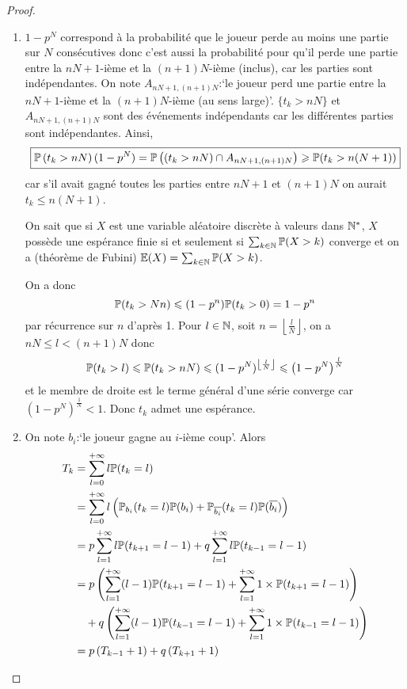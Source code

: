 \documentclass[12pt]{article}
\begin{document}
\begin{proof}
    \phantom{}
    \begin{enumerate}
        \item $1-p^{N}$ correspond à la probabilité que le joueur perde au moins une partie sur $N$ consécutives donc c'est aussi la probabilité pour qu'il perde une partie entre la $nN+1$-ième et la $(n+1)N$-ième (inclus), car les parties sont indépendantes. On note $A_{nN+1,(n+1)N}$:`le joueur perd une partie entre la $nN+1$-ième et la $(n+1)N$-ième (au sens large)'. $\lbrace t_{k}>nN\rbrace$ et $A_{nN+1,(n+1)N}$ sont des événements indépendants car les différentes parties sont indépendantes. Ainsi,
        \begin{equation}
            \boxed{\P\left(t_{k}>nN\right)(1-p^{N})=\P\left(\left(t_{k}>nN\right)\cap A_{nN+1,(n+1)N}\right)\geqslant\P(t_{k}>n(N+1))}
        \end{equation}
        car s'il avait gagné toutes les parties entre $nN+1$ et $(n+1)N$ on aurait $t_{k}\leqslant n(N+1)$.

        On sait que si $X$ est une variable aléatoire discrète à valeurs dans $\N^{*}$, $X$ possède une espérance finie si et seulement si $\sum_{k\in\N}\P(X>k)$ converge et on a (théorème de Fubini) $\E(X)=\sum_{k\in\N}\P(X>k)$.

        On a donc 
        \begin{equation}
            \P(t_{k}>Nn)\leqslant (1-p^{n})\P(t_{k}>0)=1-p^{n}
        \end{equation}
        par récurrence sur $n$ d'après 1. Pour $l\in\N$, soit $n=\left\lfloor\frac{l}{N}\right\rfloor$, on a $nN\leqslant l<(n+1)N$ donc 
        \begin{equation}
            \P(t_{k}>l)\leqslant\P(t_{k}>nN)\leqslant(1-p^{N})^{\left\lfloor\frac{l}{N}\right\rfloor}\leqslant\left(1-p^{N}\right)^{\frac{l}{N}}
        \end{equation}
        et le membre de droite est le terme général d'une série converge car $\left(1-p^{N}\right)^{\frac{1}{N}}<1$. Donc $t_{k}$ admet une espérance.

        \item On note $b_{i}$:`le joueur gagne au $i$-ième coup'. Alors 
        \begin{align}
            T_{k}
            &=\sum_{l=0}^{+\infty}l\P(t_{k}=l)\\
            &=\sum_{l=0}^{+\infty}l\left(\P_{b_{i}}(t_{k}=l)\P(b_{i})+\P_{\overline{b_{i}}}(t_{k}=l)\P(\overline{b_{i}})\right)\\
            &=p\sum_{l=1}^{+\infty}l\P(t_{k+1}=l-1)+q\sum_{l=1}^{+\infty}l\P(t_{k-1}=l-1)\\
            &=p\left(\sum_{l=1}^{+\infty}(l-1)\P(t_{k+1}=l-1)+\sum_{l=1}^{+\infty}1\times\P(t_{k+1}=l-1)\right)\notag\\
            &~~~+q\left(\sum_{l=1}^{+\infty}(l-1)\P(t_{k-1}=l-1)+\sum_{l=1}^{+\infty}1\times\P(t_{k-1}=l-1)\right)\\
            &=p\left(T_{k-1}+1\right)+q\left(T_{k+1}+1\right)
        \end{align}


\end{enumerate}
\end{proof}
\end{document}

